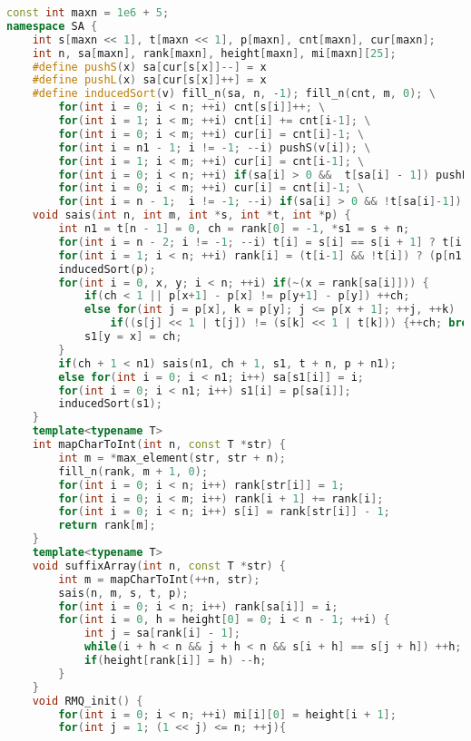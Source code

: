 \begin{lstlisting}[language=C++]
const int maxn = 1e6 + 5;
namespace SA {
    int s[maxn << 1], t[maxn << 1], p[maxn], cnt[maxn], cur[maxn];
    int n, sa[maxn], rank[maxn], height[maxn], mi[maxn][25];
    #define pushS(x) sa[cur[s[x]]--] = x
    #define pushL(x) sa[cur[s[x]]++] = x
    #define inducedSort(v) fill_n(sa, n, -1); fill_n(cnt, m, 0); \
        for(int i = 0; i < n; ++i) cnt[s[i]]++; \
        for(int i = 1; i < m; ++i) cnt[i] += cnt[i-1]; \
        for(int i = 0; i < m; ++i) cur[i] = cnt[i]-1; \
        for(int i = n1 - 1; i != -1; --i) pushS(v[i]); \
        for(int i = 1; i < m; ++i) cur[i] = cnt[i-1]; \
        for(int i = 0; i < n; ++i) if(sa[i] > 0 &&  t[sa[i] - 1]) pushL(sa[i] - 1); \
        for(int i = 0; i < m; ++i) cur[i] = cnt[i]-1; \
        for(int i = n - 1;  i != -1; --i) if(sa[i] > 0 && !t[sa[i]-1]) pushS(sa[i]-1)
    void sais(int n, int m, int *s, int *t, int *p) {
        int n1 = t[n - 1] = 0, ch = rank[0] = -1, *s1 = s + n;
        for(int i = n - 2; i != -1; --i) t[i] = s[i] == s[i + 1] ? t[i + 1] : s[i] > s[i + 1];
        for(int i = 1; i < n; ++i) rank[i] = (t[i-1] && !t[i]) ? (p[n1] = i, n1++) : -1;
        inducedSort(p);
        for(int i = 0, x, y; i < n; ++i) if(~(x = rank[sa[i]])) {
            if(ch < 1 || p[x+1] - p[x] != p[y+1] - p[y]) ++ch;
            else for(int j = p[x], k = p[y]; j <= p[x + 1]; ++j, ++k)
                if((s[j] << 1 | t[j]) != (s[k] << 1 | t[k])) {++ch; break;}
            s1[y = x] = ch;
        }
        if(ch + 1 < n1) sais(n1, ch + 1, s1, t + n, p + n1);
        else for(int i = 0; i < n1; i++) sa[s1[i]] = i;
        for(int i = 0; i < n1; i++) s1[i] = p[sa[i]];
        inducedSort(s1);
    }
    template<typename T>
    int mapCharToInt(int n, const T *str) {
        int m = *max_element(str, str + n);
        fill_n(rank, m + 1, 0);
        for(int i = 0; i < n; i++) rank[str[i]] = 1;
        for(int i = 0; i < m; i++) rank[i + 1] += rank[i];
        for(int i = 0; i < n; i++) s[i] = rank[str[i]] - 1;
        return rank[m];
    }
    template<typename T>
    void suffixArray(int n, const T *str) {
        int m = mapCharToInt(++n, str);
        sais(n, m, s, t, p);
        for(int i = 0; i < n; i++) rank[sa[i]] = i;
        for(int i = 0, h = height[0] = 0; i < n - 1; ++i) {
            int j = sa[rank[i] - 1];
            while(i + h < n && j + h < n && s[i + h] == s[j + h]) ++h;
            if(height[rank[i]] = h) --h;
        }
    }
    void RMQ_init() {
        for(int i = 0; i < n; ++i) mi[i][0] = height[i + 1];
        for(int j = 1; (1 << j) <= n; ++j){

\end{lstlisting}
